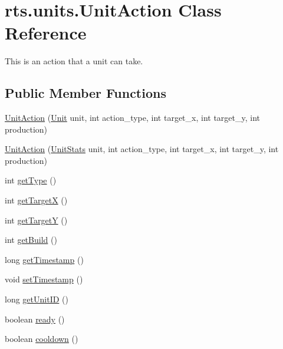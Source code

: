\hypertarget{classrts_1_1units_1_1_unit_action}{
\section{rts.units.UnitAction Class Reference}
\label{classrts_1_1units_1_1_unit_action}
}


This is an action that a unit can take.  


\subsection*{Public Member Functions}
\begin{DoxyCompactItemize}
\item 
\hyperlink{classrts_1_1units_1_1_unit_action_ab1386bad876aac3b37ca5def8326cd3b}{UnitAction} (\hyperlink{classrts_1_1units_1_1_unit}{Unit} unit, int action\_\-type, int target\_\-x, int target\_\-y, int production)
\item 
\hyperlink{classrts_1_1units_1_1_unit_action_a3831fcadc157346bb2a01c1d15b41311}{UnitAction} (\hyperlink{classrts_1_1units_1_1_unit_stats}{UnitStats} unit, int action\_\-type, int target\_\-x, int target\_\-y, int production)
\item 
int \hyperlink{classrts_1_1units_1_1_unit_action_ac54030412c49e6f9d71612e1f0d4af99}{getType} ()
\item 
int \hyperlink{classrts_1_1units_1_1_unit_action_a273bdada50fab904ba79be86a66589e6}{getTargetX} ()
\item 
int \hyperlink{classrts_1_1units_1_1_unit_action_af48ff572c01bcfc593cd2c53c31e869d}{getTargetY} ()
\item 
int \hyperlink{classrts_1_1units_1_1_unit_action_a18deceaca1932c46a5a0d35b8ab92c41}{getBuild} ()
\item 
long \hyperlink{classrts_1_1units_1_1_unit_action_a848bec2abed44119f4908def80daaddf}{getTimestamp} ()
\item 
void \hyperlink{classrts_1_1units_1_1_unit_action_a9d2189d350f9abebf1700e1cf778af3e}{setTimestamp} ()
\item 
long \hyperlink{classrts_1_1units_1_1_unit_action_a2767ad6bf0600b9ef4e5dcef1aa7f1e9}{getUnitID} ()
\item 
boolean \hyperlink{classrts_1_1units_1_1_unit_action_a1f2844f926cb36399b67b8e40923cf75}{ready} ()
\item 
boolean \hyperlink{classrts_1_1units_1_1_unit_action_a3a997af6fcddf3a98859f0aa01b4e0b3}{cooldown} ()
\item 

\end{DoxyCompactItemize}
